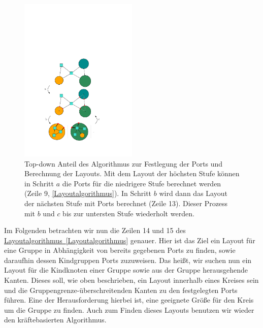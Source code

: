 \begin{figure}[h!]
\begin{center} 
  \includegraphics[width=0.5\textwidth]{Pics/TopDown.pdf}
  \caption{Top-down Anteil des Algorithmus zur Festlegung der Ports und Berechnung der Layouts.
  Mit dem Layout der höchsten Stufe können in Schritt $a$ die Ports für die niedrigere Stufe berechnet werden (Zeile 9, \autoref{Layoutalgorithmus}).
  In Schritt $b$ wird dann das Layout der nächsten Stufe mit Ports berechnet (Zeile 13).
  Dieser Prozess mit $b$ und $c$ bis zur untersten Stufe wiederholt werden. }
  \label{f:TopDown}
\end{center}
\end{figure}


Im Folgenden betrachten wir nun die Zeilen 14 und 15 des \hyperref[Layoutalgorithmus]{Layoutalgorithmus~\ref*{Layoutalgorithmus}} genauer. 
Hier ist das Ziel ein Layout für eine Gruppe in Abhängigkeit von bereits gegebenen Ports zu finden, sowie daraufhin dessen Kindgruppen Ports zuzuweisen.
Das heißt, wir suchen nun ein Layout für die Kindknoten einer Gruppe sowie aus der Gruppe herausgehende Kanten.
Dieses soll, wie oben beschrieben, ein Layout innerhalb eines Kreises sein und die Gruppengrenze-überschreitenden Kanten zu den festgelegten Ports führen.
Eine der Herausforderung hierbei ist, eine geeignete Größe für den Kreis um die Gruppe zu finden. 
Auch zum Finden dieses Layouts benutzen wir wieder den kräftebasierten Algorithmus.

